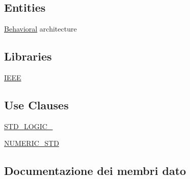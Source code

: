 \subsection*{Entities}
\begin{DoxyCompactItemize}
\item 
\hyperlink{classtb___linear_regression_1_1_behavioral}{Behavioral} architecture
\end{DoxyCompactItemize}
\subsection*{Libraries}
 \begin{DoxyCompactItemize}
\item 
\hyperlink{classtb___linear_regression_ae4f03c286607f3181e16b9aa12d0c6d4}{I\+E\+EE} 
\end{DoxyCompactItemize}
\subsection*{Use Clauses}
 \begin{DoxyCompactItemize}
\item 
\hyperlink{classtb___linear_regression_aa4b2b25246a821511120e3149b003563}{S\+T\+D\+\_\+\+L\+O\+G\+I\+C\+\_}   
\item 
\hyperlink{classtb___linear_regression_ae00f3f04545af57582ff10609eee23e2}{N\+U\+M\+E\+R\+I\+C\+\_\+\+S\+TD}   
\end{DoxyCompactItemize}


\subsection{Documentazione dei membri dato}
\subsubsection[{\texorpdfstring{I\+E\+EE}{IEEE}}]{\hspace{0.3cm}{\ttfamily [Library]}}\hypertarget{classtb___linear_regression_ae4f03c286607f3181e16b9aa12d0c6d4}{}\label{classtb___linear_regression_ae4f03c286607f3181e16b9aa12d0c6d4}
